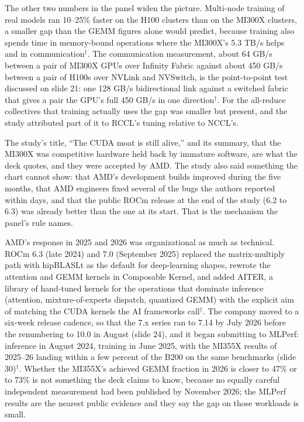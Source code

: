\documentclass[11pt,letterpaper]{article}
\begin{document}
The other two numbers in the panel widen the picture. Multi-node training of real models ran 10--25\% faster on the H100 clusters than on the MI300X clusters, a smaller gap than the GEMM figures alone would predict, because training also spends time in memory-bound operations where the MI300X's 5.3 TB/s helps and in communication$^\dagger$. The communication measurement, about 64 GB/s between a pair of MI300X GPUs over Infinity Fabric against about 450 GB/s between a pair of H100s over NVLink and NVSwitch, is the point-to-point test discussed on slide 21: one 128 GB/s bidirectional link against a switched fabric that gives a pair the GPU's full 450 GB/s in one direction$^\dagger$. For the all-reduce collectives that training actually uses the gap was smaller but present, and the study attributed part of it to RCCL's tuning relative to NCCL's.

The study's title, ``The CUDA moat is still alive,'' and its summary, that the MI300X was competitive hardware held back by immature software, are what the deck quotes, and they were accepted by AMD. The study also said something the chart cannot show: that AMD's development builds improved during the five months, that AMD engineers fixed several of the bugs the authors reported within days, and that the public ROCm release at the end of the study (6.2 to 6.3) was already better than the one at its start. That is the mechanism the panel's rule names.

AMD's response in 2025 and 2026 was organizational as much as technical. ROCm 6.3 (late 2024) and 7.0 (September 2025) replaced the matrix-multiply path with hipBLASLt as the default for deep-learning shapes, rewrote the attention and GEMM kernels in Composable Kernel, and added AITER, a library of hand-tuned kernels for the operations that dominate inference (attention, mixture-of-experts dispatch, quantized GEMM) with the explicit aim of matching the CUDA kernels the AI frameworks call$^\dagger$. The company moved to a six-week release cadence, so that the 7.x series ran to 7.14 by July 2026 before the renumbering to 10.0 in August (slide 24), and it began submitting to MLPerf: inference in August 2024, training in June 2025, with the MI355X results of 2025--26 landing within a few percent of the B200 on the same benchmarks (slide 30)$^\dagger$. Whether the MI355X's achieved GEMM fraction in 2026 is closer to 47\% or to 73\% is not something the deck claims to know, because no equally careful independent measurement had been published by November 2026; the MLPerf results are the nearest public evidence and they say the gap on those workloads is small.
\end{document}
